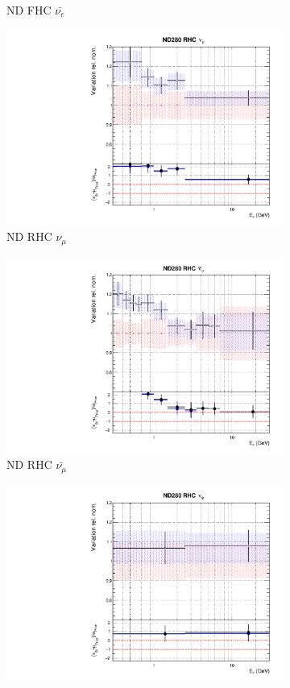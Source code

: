 \begin{figure}
\begin{subfigure}{0.45\textwidth}
  \caption{ND FHC $\bar{\nu_{e}}$}
\end{subfigure}
\begin{subfigure}{0.45\textwidth}
  \centering
  \includegraphics[width=0.75\linewidth]{figs/fixed2p2hflux4}
  \caption{ND RHC $\nu_{\mu}$}
\end{subfigure}
\begin{subfigure}{0.45\textwidth}
  \centering
  \includegraphics[width=0.75\linewidth]{figs/fixed2p2hflux5}
  \caption{ND RHC $\bar{\nu_{\mu}}$}
\end{subfigure}
\begin{subfigure}{0.45\textwidth}
  \centering
  \includegraphics[width=0.75\linewidth]{figs/fixed2p2hflux6}

\end{subfigure}
\end{figure}
